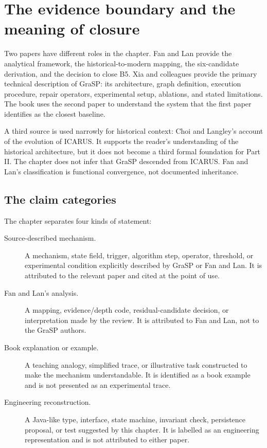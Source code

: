 \section{The evidence boundary and the meaning of closure}
\label{sec:ch17-evidence-boundary}

Two papers have different roles in the chapter. Fan and Lan provide the analytical framework, the historical-to-modern mapping, the six-candidate derivation, and the decision to close B5. Xia and colleagues provide the primary technical description of GraSP: its architecture, graph definition, execution procedure, repair operators, experimental setup, ablations, and stated limitations. The book uses the second paper to understand the system that the first paper identifies as the closest baseline.\autocite{xia2026grasp}

A third source is used narrowly for historical context: Choi and Langley's account of the evolution of ICARUS. It supports the reader's understanding of the historical architecture, but it does not become a third formal foundation for Part II. The chapter does not infer that GraSP descended from ICARUS. Fan and Lan's classification is functional convergence, not documented inheritance.\autocite{choi2018icarus}

\subsection{The claim categories}

The chapter separates four kinds of statement:

\begin{description}
  \item[Source-described mechanism.] A mechanism, state field, trigger, algorithm step, operator, threshold, or experimental condition explicitly described by GraSP or Fan and Lan. It is attributed to the relevant paper and cited at the point of use.
  \item[Fan and Lan's analysis.] A mapping, evidence/depth code, residual-candidate decision, or interpretation made by the review. It is attributed to Fan and Lan, not to the GraSP authors.
  \item[Book explanation or example.] A teaching analogy, simplified trace, or illustrative task constructed to make the mechanism understandable. It is identified as a book example and is not presented as an experimental trace.
  \item[Engineering reconstruction.] A Java-like type, interface, state machine, invariant check, persistence proposal, or test suggested by this chapter. It is labelled as an engineering representation and is not attributed to either paper.
\end{description}

